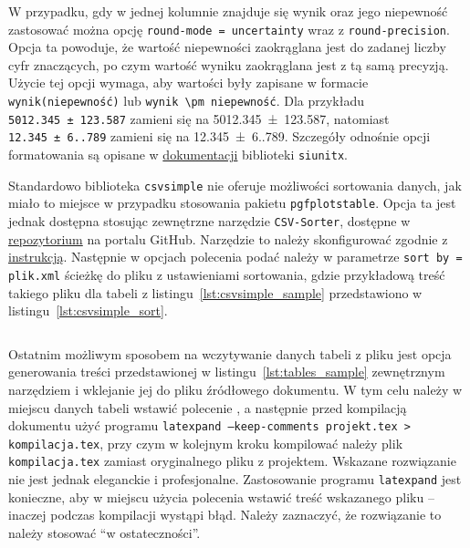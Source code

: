 W przypadku, gdy w jednej kolumnie znajduje się wynik oraz jego niepewność zastosować można opcję \verb|round-mode = uncertainty| wraz z \verb|round-precision|. Opcja ta powoduje, że wartość niepewności zaokrąglana jest do zadanej liczby cyfr znaczących, po czym wartość wyniku zaokrąglana jest z tą samą precyzją. Użycie tej opcji wymaga, aby wartości były zapisane w formacie \verb|wynik(niepewność)| lub \verb|wynik \pm niepewność|. Dla przykładu \texttt{\num[round-mode = uncertainty, round-precision = 2]{5012.345 \pm 123.587}} zamieni się na \num[round-mode = uncertainty, round-precision = 2]{5012.345 \pm 123.587}, natomiast \texttt{\num[round-mode = uncertainty, round-precision = 2]{12.345(6.789)}} zamieni się na \num[round-mode = uncertainty, round-precision = 2]{12.345(6.789)}. Szczegóły odnośnie opcji formatowania są opisane w \href{http://mirrors.ctan.org/macros/latex/contrib/siunitx/siunitx.pdf}{dokumentacji} biblioteki \texttt{siunitx}.

Standardowo biblioteka \texttt{csvsimple} nie oferuje możliwości sortowania danych, jak miało to miejsce w przypadku stosowania pakietu \texttt{pgfplotstable}. Opcja ta jest jednak dostępna stosując zewnętrzne narzędzie \texttt{CSV-Sorter}, dostępne w \href{https://github.com/T-F-S/csvsorter}{repozytorium} na portalu GitHub. Narzędzie to należy skonfigurować zgodnie z \href{http://mirrors.ctan.org/macros/latex/contrib/csvsimple/csvsimple-l3.pdf}{instrukcją}. Następnie w opcjach polecenia \texttt{\csvreader} podać należy w parametrze \verb|sort by = plik.xml| ścieżkę do pliku z ustawieniami sortowania, gdzie przykładową treść takiego pliku dla tabeli z listingu~\ref{lst:csvsimple_sample} przedstawiono w listingu~\ref{lst:csvsimple_sort}.

\begin{listing}[htb]
\inputminted{xml}{skrypty/csvsimple_sort.xml}
\end{listing}

Ostatnim możliwym sposobem na wczytywanie danych tabeli z pliku jest opcja generowania treści przedstawionej w listingu~\ref{lst:tables_sample} zewnętrznym narzędziem i wklejanie jej do pliku źródłowego dokumentu. W tym celu należy w miejscu danych tabeli wstawić polecenie \texttt{}, a następnie przed kompilacją dokumentu użyć programu \texttt{latexpand --keep-comments projekt.tex > kompilacja.tex}, przy czym w kolejnym kroku kompilować należy plik \verb|kompilacja.tex| zamiast oryginalnego pliku z projektem. Wskazane rozwiązanie nie jest jednak eleganckie i profesjonalne. Zastosowanie programu \texttt{latexpand} jest konieczne, aby w miejscu użycia polecenia \texttt{} wstawić treść wskazanego pliku -- inaczej podczas kompilacji wystąpi błąd. Należy zaznaczyć, że rozwiązanie to należy stosować \enquote{w ostateczności}.

